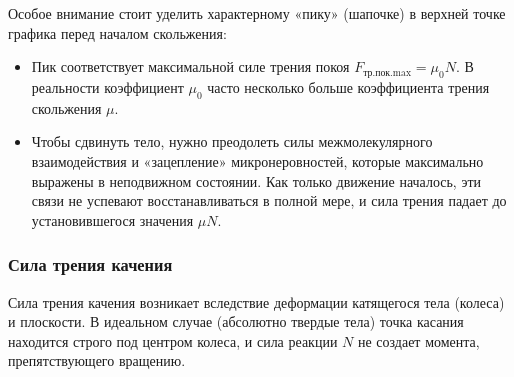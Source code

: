 \begin{center}
\end{center}

Особое внимание стоит уделить характерному «пику» (шапочке) в верхней точке графика перед началом скольжения:
\begin{itemize}
    \item Пик соответствует максимальной силе трения покоя $F_{\text{тр.пок.max}} = \mu_0 N$. В реальности коэффициент $\mu_0$ часто несколько больше коэффициента трения скольжения $\mu$.
    \item Чтобы сдвинуть тело, нужно преодолеть силы межмолекулярного взаимодействия и «зацепление» микронеровностей, которые максимально выражены в неподвижном состоянии. Как только движение началось, эти связи не успевают восстанавливаться в полной мере, и сила трения падает до установившегося значения $\mu N$.
\end{itemize}

\subsubsection{Сила трения качения}

Сила трения качения возникает вследствие деформации катящегося тела (колеса) и плоскости. В идеальном случае (абсолютно твердые тела) точка касания находится строго под центром колеса, и сила реакции $N$ не создает момента, препятствующего вращению.

